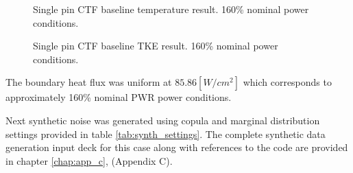 \begin{figure}[H]%
    \centering
    \qquad
    \caption[Single pin CTF baseline temperature result.  160\% nominal power conditions.]{Single pin CTF baseline temperature result.  160\% nominal power conditions.}%
    \label{fig:ctf_twall_orig}%
\end{figure}

\begin{figure}[H]%
    \centering
    \qquad
    \caption[Single pin CTF baseline TKE result.  160\% nominal power conditions.]{Single pin CTF baseline TKE result.  160\% nominal power conditions.}%
    \label{fig:ctf_tke_orig}%
\end{figure}


The boundary heat flux was uniform at $85.86 [W/cm^2]$ which corresponds to approximately 160\% nominal PWR power conditions.

Next synthetic noise was generated using copula and marginal distribution settings provided in table \ref{tab:synth_settings}. The complete synthetic data generation input deck for this case along with references to the code are provided in chapter \ref{chap:app_c}, (Appendix C).


